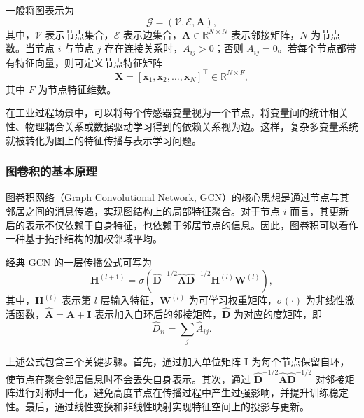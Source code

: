 \documentclass[bachelor, vlined]{DissertUESTC}
\begin{document}
    一般将图表示为
    \begin{equation}
        \mathcal{G} = (\mathcal{V}, \mathcal{E}, \mathbf{A}),
    \end{equation}
    其中，$\mathcal{V}$ 表示节点集合，$\mathcal{E}$ 表示边集合，$\mathbf{A} \in \mathbb{R}^{N \times N}$ 表示邻接矩阵，$N$ 为节点数。当节点 $i$ 与节点 $j$ 存在连接关系时，$A_{ij} > 0$；否则 $A_{ij} = 0$。若每个节点都带有特征向量，则可定义节点特征矩阵
    \begin{equation}
        \mathbf{X} = [\mathbf{x}_1, \mathbf{x}_2, \ldots, \mathbf{x}_N]^\top \in \mathbb{R}^{N \times F},
    \end{equation}
    其中 $F$ 为节点特征维数。
    
    在工业过程场景中，可以将每个传感器变量视为一个节点，将变量间的统计相关性、物理耦合关系或数据驱动学习得到的依赖关系视为边。这样，复杂多变量系统就被转化为图上的特征传播与表示学习问题。
    
    \subsubsection{图卷积的基本原理}
    
    图卷积网络（Graph Convolutional Network, GCN）的核心思想是通过节点与其邻居之间的消息传递，实现图结构上的局部特征聚合。对于节点 $i$ 而言，其更新后的表示不仅依赖于自身特征，也依赖于邻居节点的信息。因此，图卷积可以看作一种基于拓扑结构的加权邻域平均。
    
    经典 GCN 的一层传播公式可写为
    \begin{equation}
        \mathbf{H}^{(l+1)} =
        \sigma\!\left(
            \hat{\mathbf{D}}^{-1/2}
            \hat{\mathbf{A}}
            \hat{\mathbf{D}}^{-1/2}
            \mathbf{H}^{(l)}
            \mathbf{W}^{(l)}
        \right),
    \end{equation}
    其中，$\mathbf{H}^{(l)}$ 表示第 $l$ 层输入特征，$\mathbf{W}^{(l)}$ 为可学习权重矩阵，$\sigma(\cdot)$ 为非线性激活函数，$\hat{\mathbf{A}} = \mathbf{A} + \mathbf{I}$ 表示加入自环后的邻接矩阵，$\hat{\mathbf{D}}$ 为对应的度矩阵，即
    \begin{equation}
        \hat{D}_{ii} = \sum_j \hat{A}_{ij}.
    \end{equation}
    
    上述公式包含三个关键步骤。首先，通过加入单位矩阵 $\mathbf{I}$ 为每个节点保留自环，使节点在聚合邻居信息时不会丢失自身表示。其次，通过 $\hat{\mathbf{D}}^{-1/2}\hat{\mathbf{A}}\hat{\mathbf{D}}^{-1/2}$ 对邻接矩阵进行对称归一化，避免高度节点在传播过程中产生过强影响，并提升训练稳定性。最后，通过线性变换和非线性映射实现特征空间上的投影与更新。
    
\end{document}

